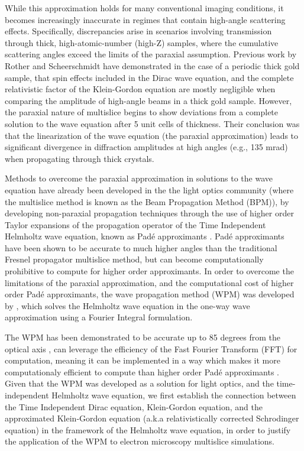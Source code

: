 \documentclass{article}
\begin{document}
While this approximation holds for many conventional imaging conditions, it becomes increasingly inaccurate in regimes that contain high-angle scattering effects. 
Specifically, discrepancies arise in scenarios involving transmission through thick, high-atomic-number (high-Z) samples, 
where the cumulative scattering angles exceed the limits of the paraxial assumption. Previous work by Rother and Scheerschmidt \cite{RotherScheerschmidt2009} have demonstrated 
in the case of a periodic thick gold sample, that spin effects included in the Dirac wave equation, and the complete relativistic factor of the Klein-Gordon equation are mostly negligible when 
comparing the amplitude of high-angle beams in a thick gold sample. However, the paraxial nature of multislice begins to show deviations from a complete solution to the wave equation after 5 unit cells 
of thickness. Their conclusion was that the linearization of the wave equation (the paraxial approximation) leads to significant divergence in diffraction 
amplitudes at high angles (e.g., 135 mrad) when propagating through thick crystals. 

Methods to overcome the paraxial approximation in solutions to the wave equation have already been developed in the the light optics community 
(where the multislice method is known as the Beam Propagation Method (BPM)), by developing non-paraxial propagation techniques through the use of higher 
order Taylor expansions of the propagation operator of the Time Independent Helmholtz wave equation, known as Padé approximants \cite{????}. Padé approximants have been 
shown to be accurate to much higher angles than the traditional Fresnel propagator multislice method, but can become computationally prohibitive to compute for higher order 
approximants. In order to overcome the limitations of the paraxial approximation, and the computational cost of higher order Padé approximants, the wave propagation 
method (WPM) was developed by \cite{Brenner1994}, which solves the Helmholtz wave equation in the one-way wave approximation using a Fourier Integral formulation.

The WPM has been demonstrated to be accurate up to 85 degrees from the optical axis \cite{????}, can leverage the efficiency of the Fast Fourier Transform (FFT) for computation,
meaning it can be implemented in a way which makes it more computationaly efficient to compute than higher order Padé approximants \cite{Schmidt}. Given that the WPM was developed 
as a solution for light optics, and the time-independent Helmholtz wave equation, we first establish the connection between the Time Independent Dirac equation, 
Klein-Gordon equation, and the approximated Klein-Gordon equation (a.k.a relativistically corrected Schrodinger equation) in the framework of the Helmholtz wave equation, in order to
justify the application of the WPM to electron microscopy multislice simulations.
\end{document}
